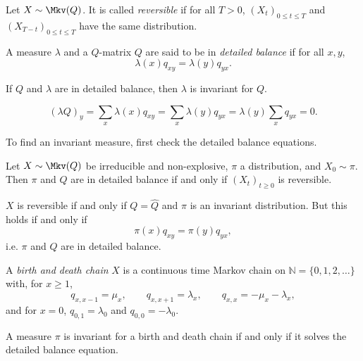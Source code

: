\documentclass[12pt]{article}
\begin{document}
\begin{definition}
	Let $X \sim \Mkv(Q)$. It is called \emph{reversible} if for all $T > 0$, $(X_t)_{0 \leq t \leq T}$ and $(X_{T - t})_{0 \leq t \leq T}$ have the same distribution.
\end{definition}

\begin{definition}
	A measure $\lambda$ and a $Q$-matrix $Q$ are said to be in \emph{detailed balance} if for all $x, y$,
	\[
	\lambda(x) q_{xy} = \lambda(y) q_{yx}
	.\]
\end{definition}

\begin{lemma}
	If $Q$ and $\lambda$ are in detailed balance, then $\lambda$ is invariant for $Q$.
\end{lemma}

\begin{proofbox}
	\[
		(\lambda Q)_{y} = \sum_{x} \lambda (x) q_{xy} = \sum_{x} \lambda(y) q_{yx} = \lambda(y) \sum_{x} q_{yx} = 0
	.\]
\end{proofbox}

\begin{remark}
	To find an invariant measure, first check the detailed balance equations.
\end{remark}

\begin{lemma}
	Let $X \sim \Mkv(Q)$ be irreducible and non-explosive, $\pi$ a distribution, and $X_0 \sim \pi$. Then $\pi$ and $Q$ are in detailed balance if and only if $(X_t)_{t \geq 0}$ is reversible.
\end{lemma}

\begin{proofbox}
	$X$ is reversible if and only if $Q = \hat Q$ and $\pi$ is an invariant distribution. But this holds if and only if
	\[
	\pi(x)q_{xy} = \pi(y)q_{yx}
	,\]
	i.e. $\pi$ and $Q$ are in detailed balance.
\end{proofbox}

\begin{definition}
	A \emph{birth and death chain} $X$ is a continuous time Markov chain on $\mathbb{N} = \{0, 1, 2, \ldots\}$ with, for $x \geq 1$,
	\[
	q_{x,x-1} = \mu_x, \qquad q_{x,x+1} = \lambda_x, \qquad q_{x,x} = - \mu_x - \lambda_x
	,\]
	and for $x = 0$, $q_{0, 1} = \lambda_0$ and $q_{0,0}=-\lambda_0$.
\end{definition}

\begin{lemma}
	A measure $\pi$ is invariant for a birth and death chain if and only if it solves the detailed balance equation.
\end{lemma}
\end{document}
